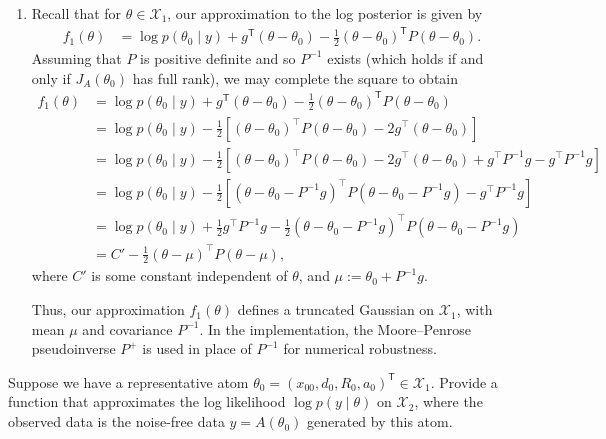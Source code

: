 \documentclass{homework}
\begin{document}
\begin{enumerate}
    Vectorising each of the derivatives in \eqref{eq:forward_map_partials} 
    gives the four columns of \(J_A(\theta_0)\).

    \item Recall that for $\theta \in \mathcal{X}_1$, our approximation to the log posterior is given by
    \begin{align}
    f_1(\theta) 
    &= \log p(\theta_0\mid y)+g^{\mathsf T}\left(\theta-\theta_0\right)-\frac12\left(\theta-\theta_0\right)^{\mathsf T}P\left(\theta-\theta_0\right).\nonumber
    \end{align}
    Assuming that $P$ is positive definite and so $P^{-1}$ exists (which holds if and only if $J_A(\theta_0)$ has full rank), we may complete the square to obtain
    \begin{align}
    f_1(\theta) 
    &= \log p(\theta_0\mid y)+g^{\mathsf T}\left(\theta-\theta_0\right)-\frac12\left(\theta-\theta_0\right)^{\mathsf T}P\left(\theta-\theta_0\right)\nonumber\\
    &= \log p(\theta_0\mid y)-\frac12\left[(\theta-\theta_0)^\top P(\theta-\theta_0)-2g^\top(\theta-\theta_0)\right]\nonumber\\
    &= \log p(\theta_0\mid y)-\frac12\left[(\theta-\theta_0)^\top P(\theta-\theta_0)-2g^\top(\theta-\theta_0)+g^\top P^{-1}g-g^\top P^{-1}g\right]\nonumber\\
    &= \log p(\theta_0\mid y)-\frac12\left[(\theta-\theta_0-P^{-1}g)^\top P(\theta-\theta_0-P^{-1}g)-g^\top P^{-1}g\right]\nonumber\\
    &= \log p(\theta_0\mid y) + \frac12g^\top P^{-1}g - \frac12(\theta-\theta_0-P^{-1}g)^\top P(\theta-\theta_0-P^{-1}g)\nonumber\\
    &= C' - \frac12(\theta-\mu)^\top P(\theta-\mu), \nonumber
    \end{align}
    where $C'$ is some constant independent of $\theta$, and $\mu := \theta_0+P^{-1}g$.

    Thus, our approximation $f_1(\theta)$ defines a truncated Gaussian on $\mathcal{X}_1$, 
    with mean $\mu$ and covariance $P^{-1}$.
    In the implementation, the Moore--Penrose pseudoinverse \(P^{+}\) is used in
    place of \(P^{-1}\) for numerical robustness.
\end{enumerate}


\pagebreak
\question*{}  
Suppose we have a representative atom $\theta_0=(x_{00},d_0,R_0,a_0)^{\mathsf T}\in\mathcal{X}_1$.
Provide a function that approximates the log likelihood $\log p(y\mid\theta)$ on $\mathcal{X}_2$, 
where the observed data is the noise-free data $y=A(\theta_0)$ generated by this atom.
\end{document}
